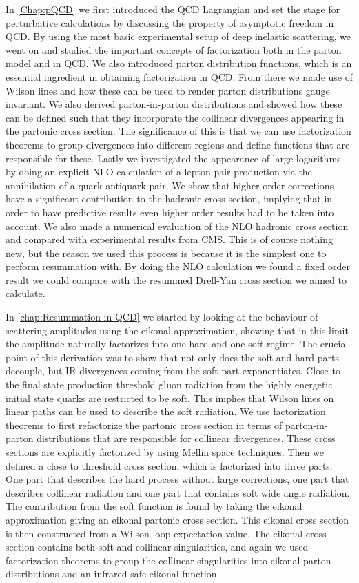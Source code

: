 \medskip
In \cref{Chap:pQCD} we first introduced the QCD Lagrangian and set the stage for perturbative calculations by discussing the property of asymptotic freedom in QCD. By using the most basic experimental setup of deep inelastic scattering, we went on and studied the important concepts of factorization both in the parton model and in QCD. We also introduced parton distribution functions, which is an essential ingredient in obtaining factorization in QCD. From there we made use of Wilson lines and how these can be used to render parton distributions gauge invariant. We also derived parton-in-parton distributions and showed how these can be defined such that they incorporate the collinear divergences appearing in the partonic cross section. The significance of this is that we can use factorization theorems to group divergences into different regions and define functions that are responsible for these. Lastly we investigated the appearance of large logarithms by doing an explicit NLO calculation of a lepton pair production via the annihilation of a quark-antiquark pair. We show that higher order corrections have a significant contribution to the hadronic cross section, implying that in order to have predictive results even higher order results had to be taken into account. We also made a numerical evaluation of the NLO hadronic cross section and compared with experimental results from CMS. This is of course nothing new, but the reason we used this process is because it is the simplest one to perform resummation with. By doing the NLO calculation we found a fixed order result we could compare with the resummed Drell-Yan cross section we aimed to calculate.

\medskip
In \cref{chap:Resummation in QCD} we started by looking at the behaviour of scattering amplitudes using the eikonal approximation, showing that in this limit the amplitude naturally factorizes into one hard and one soft regime. The crucial point of this derivation was to show that not only does the soft and hard parts decouple, but IR divergences coming from the soft part exponentiates. Close to the final state production threshold gluon radiation from the highly energetic initial state quarks are restricted to be soft. This implies that Wilson lines on linear paths can be used to describe the soft radiation. We use factorization theorems to first refactorize the partonic cross section in terms of parton-in-parton distributions that are responsible for collinear divergences. These cross sections are explicitly factorized by using Mellin space techniques. Then we defined a close to threshold cross section, which is factorized into three parts. One part that describes the hard process without large corrections, one part that describes collinear radiation and one part that contains soft wide angle radiation. The contribution from the soft function is found by taking the eikonal approximation giving an eikonal partonic cross section. This eikonal cross section is then constructed from a Wilson loop expectation value. The eikonal cross section contains both soft and collinear singularities, and again we used factorization theorems to group the collinear singularities into eikonal parton distributions and an infrared safe eikonal function. 

